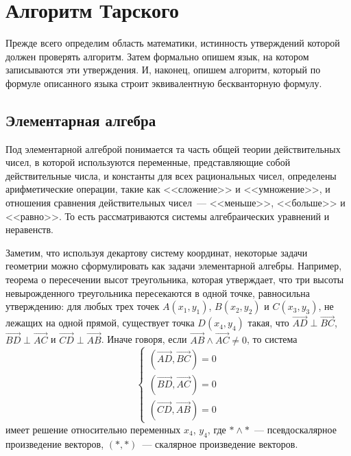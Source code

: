 \section{Алгоритм Тарского}

Прежде всего определим область математики, истинность утверждений которой должен проверять алгоритм. Затем формально опишем язык, на котором записываются эти утверждения. И, наконец, опишем алгоритм, который по формуле описанного языка строит эквивалентную бескванторную формулу.

\subsection{Элементарная алгебра}

Под элементарной алгеброй понимается та часть общей теории действительных чисел, в которой используются переменные, представляющие собой действительные числа, и константы для всех рациональных чисел, определены арифметические операции, такие как <<сложение>> и <<умножение>>, и отношения сравнения действительных чисел~--- <<меньше>>, <<больше>> и <<равно>>. То есть рассматриваются системы алгебраических уравнений и неравенств.

Заметим, что используя декартову систему координат, некоторые задачи геометрии можно сформулировать как задачи элементарной алгебры. Например, теорема о пересечении высот треугольника, которая утверждает, что три высоты невырожденного треугольника пересекаются в одной точке, равносильна утверждению: для любых трех точек $A(x_1, y_1)$, $B(x_2, y_2)$ и $C(x_3, y_3)$, не лежащих на одной прямой, существует точка $D(x_4, y_4)$ такая, что $\overrightarrow{AD} \perp \overrightarrow{BC}$, $\overrightarrow{BD} \perp \overrightarrow{AC}$ и $\overrightarrow{CD} \perp \overrightarrow{AB}$. Иначе говоря, если $\overrightarrow{AB} \land \overrightarrow{AC} \neq 0$, то система
\begin{equation*}
    \begin{cases}
        \left(\overrightarrow{AD}, \overrightarrow{BC}\right) = 0 \\
        \left(\overrightarrow{BD}, \overrightarrow{AC}\right) = 0 \\
        \left(\overrightarrow{CD}, \overrightarrow{AB}\right) = 0
    \end{cases}
\end{equation*}
имеет решение относительно переменных $x_4$, $y_4$, где $* \land *$~--- псевдоскалярное произведение векторов, $(*, *)$~--- скалярное произведение векторов.

